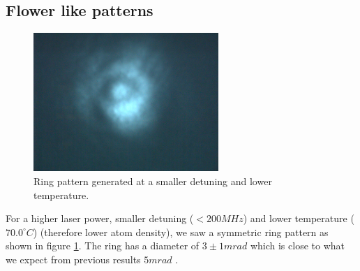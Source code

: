 \documentclass[aps,twocolumn,secnumarabic,balancelastpage,amsmath,amssymb,nofootinbib]{revtex4}
\begin{document}
\subsection{Flower like patterns}
\begin{figure}
  \includegraphics[width=7cm]{cone.png}
  \caption{Ring pattern generated at a smaller detuning and lower temperature.}
  \label{cone}
\end{figure}
For a higher laser power, smaller detuning ($<200MHz$) and lower temperature ($70.0^{\circ}C$) (therefore lower atom density), we saw a symmetric ring pattern as shown in figure \ref{cone}. The ring has a diameter of $3\pm1mrad$ which is close to what we expect from previous results $5mrad$ \cite{rb_switch}.
\end{document}
